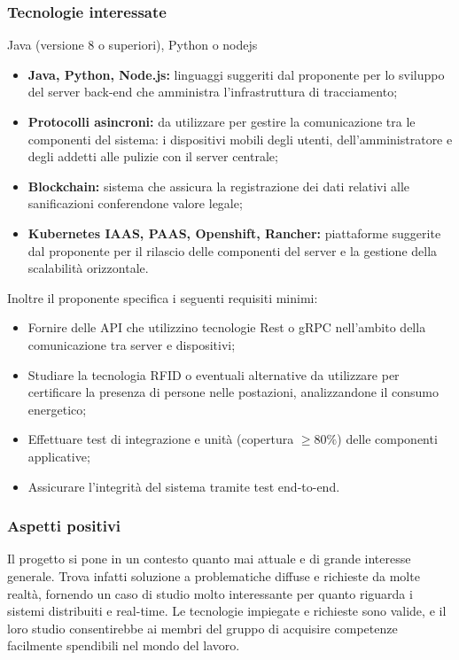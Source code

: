 \subsubsection{Tecnologie interessate}

Java (versione 8 o superiori), Python o nodejs
\begin{itemize}
	\item{\textbf{Java, Python, Node.js:}} linguaggi suggeriti dal proponente per lo sviluppo del server back-end che amministra l'infrastruttura di tracciamento;
	\item{\textbf{Protocolli asincroni:}} da utilizzare per gestire la comunicazione tra le componenti del sistema: i dispositivi mobili degli utenti, dell'amministratore e degli addetti alle pulizie con il server centrale;
	\item{\textbf{Blockchain:}} sistema che assicura la registrazione dei dati relativi alle sanificazioni conferendone valore legale;  
	\item{\textbf{Kubernetes IAAS, PAAS, Openshift, Rancher:}} piattaforme suggerite dal proponente per il rilascio delle componenti del server e la gestione della scalabilità orizzontale.
\end{itemize}

Inoltre il proponente specifica i seguenti requisiti minimi:
\begin{itemize}
	\item Fornire delle API che utilizzino tecnologie Rest o gRPC nell'ambito della comunicazione tra server e dispositivi;
	\item Studiare la tecnologia RFID o eventuali alternative da utilizzare per certificare la presenza di persone nelle postazioni, analizzandone il consumo energetico;
	\item Effettuare test di integrazione e unità (copertura $\geq 80\%$) delle componenti applicative;
	\item Assicurare l'integrità del sistema tramite test end-to-end.
\end{itemize}
	
	
	
\subsubsection{Aspetti positivi}

Il progetto si pone in un contesto quanto mai attuale e di grande interesse generale. Trova infatti soluzione a problematiche diffuse e richieste da molte realtà, fornendo un caso di studio molto interessante per quanto riguarda i sistemi distribuiti e real-time. Le tecnologie impiegate e richieste sono valide, e il loro studio consentirebbe ai membri del gruppo di acquisire competenze facilmente spendibili nel mondo del lavoro.




